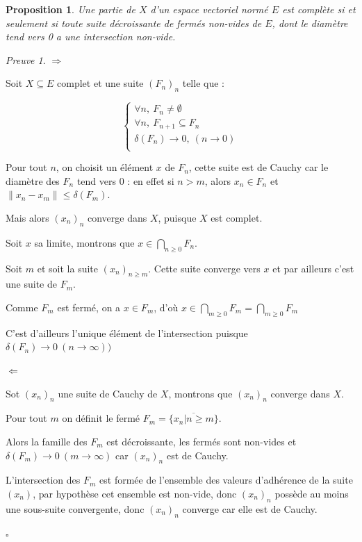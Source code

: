 \documentclass[]{article}
\newtheorem{myproposition}{Proposition}
\theoremstyle{remark}
\newtheorem{myproof}{Preuve}
\theoremstyle{definition}
\newcommand{\cqfd}{
	\hfill$\square$
}
\newenvironment{proofpart}[1]{
	\leavevmode
	
	\noindent
	{\textit{\textbf{\boldmath #1}}}
	
}{
	\checkmark
}
\begin{document}
\begin{myproposition}
	Une partie de $X$ d'un espace vectoriel normé $E$ est complète si et seulement si toute suite décroissante de fermés non-vides de $E$, dont le diamètre tend vers 0 a une intersection non-vide.
\end{myproposition}

\begin{myproof}
	\begin{proofpart}{$\Longrightarrow$}
		Soit $X \subseteq E$ complet et une suite $(F_n)_n$ telle que :
		
		$$
		\left\{
			\begin{array}{l}
				\forall n, ~ F_n \neq \emptyset \\
				\forall n, ~ F_{n+1} \subseteq F_n \\
				\delta (F_n) \longrightarrow 0, ~ (n \rightarrow 0) \\
			\end{array}
		\right.
		$$
		
		Pour tout $n$, on choisit un élément $x$ de $F_n$, cette suite est de Cauchy car le diamètre des $F_n$ tend vers 0 : en effet si $n > m$, alors $x_n \in F_n$ et $\|x_n - x_m\| \leqslant \delta (F_m)$.
		
		Mais alors $(x_n)_n$ converge dans $X$, puisque $X$ est complet.
		
		Soit $x$ sa limite, montrons que $x \in \bigcap_{n \geqslant 0} F_n$.
		
		Soit $m$ et soit la suite $(x_n)_{n \geqslant m}$. Cette suite converge vers $x$ et par ailleurs c'est une suite de $F_m$.
		
		Comme $F_m$ est fermé, on a $x \in F_m$, d'où $x \in \bigcap_{m \geqslant 0} F_m = \bigcap_{m \geqslant 0} F_m$
		
		C'est d'ailleurs l'unique élément de l'intersection puisque $\delta(F_n) \longrightarrow 0 ~ (n \rightarrow \infty))$
	\end{proofpart}
	
	\begin{proofpart}{$\Longleftarrow$}
		Sot $(x_n)_n$ une suite de Cauchy de $X$, montrons que $(x_n)_n$ converge dans $X$.
		
		Pour tout $m$ on définit le fermé $F_m=\overline{\{x_n | n \geqslant m\}}$.
		
		Alors la famille des $F_m$ est décroissante, les fermés sont non-vides et $\delta(F_m) \longrightarrow 0 ~ (m \rightarrow \infty)$ car $(x_n)_n$ est de Cauchy.
		
		L'intersection des $F_m$ est formée de l'ensemble des valeurs d'adhérence de la suite $(x_n)$, par hypothèse cet ensemble est non-vide, donc $(x_n)_n$ possède au moins une sous-suite convergente, donc $(x_n)_n$ converge car elle est de Cauchy.
	\end{proofpart}
	
	\cqfd
\end{myproof}
\end{document}
